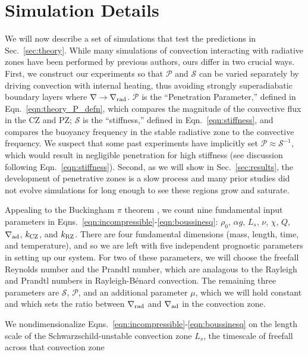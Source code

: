 \documentclass[twocolumn, linenumbers]{aastex631}
\newcommand{\gradrad}{\ensuremath{\nabla_{\rm{rad}}}}
\newcommand{\gradad}{\ensuremath{\nabla_{\rm{ad}}}}
\newcommand{\justgrad}{\ensuremath{\nabla}}
\newcommand{\mP}{\ensuremath{\mathcal{P}}}
\newcommand{\mS}{\ensuremath{\mathcal{S}}}
\newcommand{\editone}[1]{#1}
\begin{document}
\section{Simulation Details}
We will now describe a set of simulations that test the predictions in Sec.~\ref{sec:theory}.
While many simulations of convection interacting with radiative zones have been performed by previous authors, ours differ in two crucial ways.
First, we construct our experiments so that $\mP$ and $\mS$ can be varied separately \editone{by driving convection with internal heating, thus avoiding strongly superadiabatic boundary layers where $\justgrad \rightarrow \gradrad$}.
$\mP$ is the ``Penetration Parameter,'' defined in Eqn.~\ref{eqn:theory_P_defn}, which compares the magnitude of the convective flux in the CZ and PZ; $\mS$ is the ``stiffness,'' defined in Eqn.~\ref{eqn:stiffness}, and compares the buoyancy frequency in the stable radiative zone to the convective frequency. 
We suspect that some past experiments have implicitly set $\mP \approx \mS^{-1}$, which would result in negligible penetration for high stiffness \editone{(see discussion following Eqn.~\ref{eqn:stiffness})}.
Second, as we will show in Sec.~\ref{sec:results}, the development of penetrative zones is a slow process and many prior studies did not evolve simulations for long enough to see these regions grow and saturate.

\editone{
    Appealing to the Buckingham $\pi$ theorem \citep{buckingham_1914}, we count nine fundamental input parameters in Eqns.~\ref{eqn:incompressible}-\ref{eqn:boussinesq}: $\rho_0$, $\alpha g$, $L_s$, $\nu$, $\chi$, $Q$, $\gradad$, $k_{\rm{CZ}}$, and $k_{\rm{RZ}}$.
    There are four fundamental dimensions (mass, length, time, and temperature), and so we are left with five independent prognostic parameters in setting up our system.
    For two of these parameters, we will choose the freefall Reynolds number and the Prandtl number, which are analagous to the Rayleigh and Prandtl numbers in Rayleigh-B\'{e}nard convection.
    The remaining three parameters are $\mS$, $\mP$, and an additional parameter $\mu$, which we will hold constant and which sets the ratio between $\gradrad$ and $\gradad$ in the convection zone.
}

We nondimensionalize Eqns.~\ref{eqn:incompressible}-\ref{eqn:boussinesq} on the length scale of the Schwarzschild-unstable convection zone $L_s$, the timescale of freefall across that convection zone 
\end{document}
